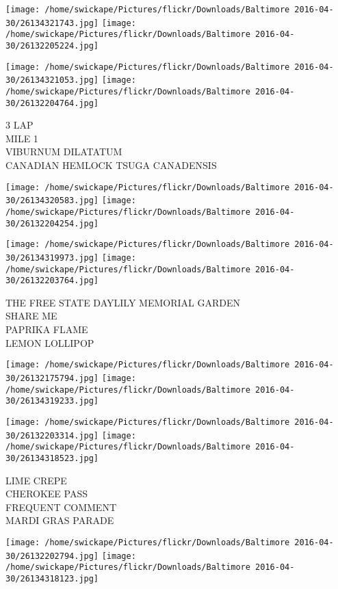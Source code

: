 \documentclass[10pt,letterpaper]{article}
\begin{document}
\texttt{[image: /home/swickape/Pictures/flickr/Downloads/Baltimore 2016-04-30/26134321743.jpg]}
\texttt{[image: /home/swickape/Pictures/flickr/Downloads/Baltimore 2016-04-30/26132205224.jpg]}

\texttt{[image: /home/swickape/Pictures/flickr/Downloads/Baltimore 2016-04-30/26134321053.jpg]}
\texttt{[image: /home/swickape/Pictures/flickr/Downloads/Baltimore 2016-04-30/26132204764.jpg]}

3 LAP\\
MILE 1\\
VIBURNUM DILATATUM\\
CANADIAN HEMLOCK TSUGA CANADENSIS\\
\pagebreak

\texttt{[image: /home/swickape/Pictures/flickr/Downloads/Baltimore 2016-04-30/26134320583.jpg]}
\texttt{[image: /home/swickape/Pictures/flickr/Downloads/Baltimore 2016-04-30/26132204254.jpg]}

\texttt{[image: /home/swickape/Pictures/flickr/Downloads/Baltimore 2016-04-30/26134319973.jpg]}
\texttt{[image: /home/swickape/Pictures/flickr/Downloads/Baltimore 2016-04-30/26132203764.jpg]}

THE FREE STATE DAYLILY MEMORIAL GARDEN\\
SHARE ME\\
PAPRIKA FLAME\\
LEMON LOLLIPOP\\
\pagebreak

\texttt{[image: /home/swickape/Pictures/flickr/Downloads/Baltimore 2016-04-30/26132175794.jpg]}
\texttt{[image: /home/swickape/Pictures/flickr/Downloads/Baltimore 2016-04-30/26134319233.jpg]}

\texttt{[image: /home/swickape/Pictures/flickr/Downloads/Baltimore 2016-04-30/26132203314.jpg]}
\texttt{[image: /home/swickape/Pictures/flickr/Downloads/Baltimore 2016-04-30/26134318523.jpg]}

LIME CREPE\\
CHEROKEE PASS\\
FREQUENT COMMENT\\
MARDI GRAS PARADE\\
\pagebreak

\texttt{[image: /home/swickape/Pictures/flickr/Downloads/Baltimore 2016-04-30/26132202794.jpg]}
\texttt{[image: /home/swickape/Pictures/flickr/Downloads/Baltimore 2016-04-30/26134318123.jpg]}
\end{document}
